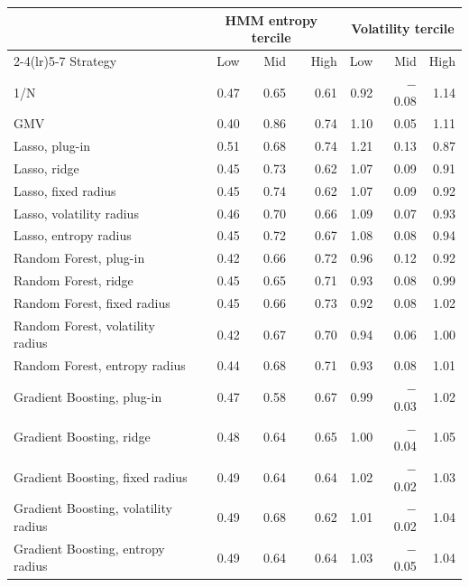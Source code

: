 \begin{tabular}{lrrrrrr}
\toprule
 & \multicolumn{3}{c}{HMM entropy tercile} & \multicolumn{3}{c}{Volatility tercile} \\
\cmidrule(lr){2-4}\cmidrule(lr){5-7}
Strategy & Low & Mid & High & Low & Mid & High \\
\midrule
1/N & 0.47 & 0.65 & 0.61 & 0.92 & $-$0.08 & 1.14 \\
GMV & 0.40 & 0.86 & 0.74 & 1.10 & 0.05 & 1.11 \\
\midrule
Lasso, plug-in & 0.51 & 0.68 & 0.74 & 1.21 & 0.13 & 0.87 \\
Lasso, ridge & 0.45 & 0.73 & 0.62 & 1.07 & 0.09 & 0.91 \\
Lasso, fixed radius & 0.45 & 0.74 & 0.62 & 1.07 & 0.09 & 0.92 \\
Lasso, volatility radius & 0.46 & 0.70 & 0.66 & 1.09 & 0.07 & 0.93 \\
Lasso, entropy radius & 0.45 & 0.72 & 0.67 & 1.08 & 0.08 & 0.94 \\
\midrule
Random Forest, plug-in & 0.42 & 0.66 & 0.72 & 0.96 & 0.12 & 0.92 \\
Random Forest, ridge & 0.45 & 0.65 & 0.71 & 0.93 & 0.08 & 0.99 \\
Random Forest, fixed radius & 0.45 & 0.66 & 0.73 & 0.92 & 0.08 & 1.02 \\
Random Forest, volatility radius & 0.42 & 0.67 & 0.70 & 0.94 & 0.06 & 1.00 \\
Random Forest, entropy radius & 0.44 & 0.68 & 0.71 & 0.93 & 0.08 & 1.01 \\
\midrule
Gradient Boosting, plug-in & 0.47 & 0.58 & 0.67 & 0.99 & $-$0.03 & 1.02 \\
Gradient Boosting, ridge & 0.48 & 0.64 & 0.65 & 1.00 & $-$0.04 & 1.05 \\
Gradient Boosting, fixed radius & 0.49 & 0.64 & 0.64 & 1.02 & $-$0.02 & 1.03 \\
Gradient Boosting, volatility radius & 0.49 & 0.68 & 0.62 & 1.01 & $-$0.02 & 1.04 \\
Gradient Boosting, entropy radius & 0.49 & 0.64 & 0.64 & 1.03 & $-$0.05 & 1.04 \\
\bottomrule
\end{tabular}